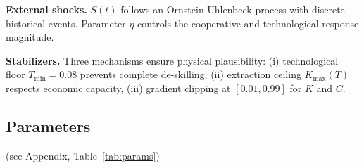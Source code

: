 \textbf{External shocks.} $S(t)$ follows an Ornstein-Uhlenbeck process with discrete historical events. Parameter $\eta$ controls the cooperative and technological response magnitude.

\textbf{Stabilizers.} Three mechanisms ensure physical plausibility: (i) technological floor $T_{\min}=0.08$ prevents complete de-skilling, (ii) extraction ceiling $K_{\max}(T)$ respects economic capacity, (iii) gradient clipping at $[0.01, 0.99]$ for $K$ and $C$.

\subsection{Parameters}

(see Appendix, Table~\ref{tab:params})
